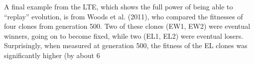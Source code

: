 \documentclass{article}
\begin{document}
A final example from the LTE, which shows the full power of being able to “replay” evolution, is from Woods et al. (2011), who compared the fitnesses of four clones from generation 500. Two of these clones (EW1, EW2) were eventual winners, going on to become fixed, while two (EL1, EL2) were eventual losers. Surprisingly, when measured at generation 500, the fitness of the EL clones was significantly higher (by about 6%
\end{document}

